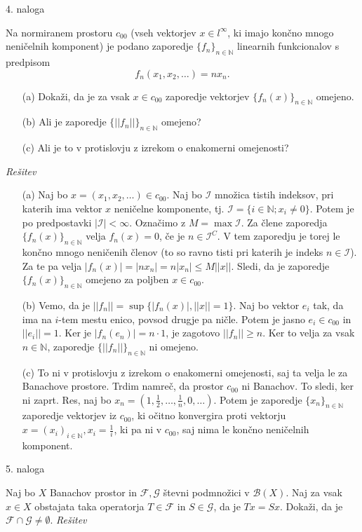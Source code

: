 \documentclass[a4paper, 12pt]{article}
\newcommand{\N}{\mathbb{N}}
\begin{document}
\begin{flushleft}
4. naloga
\end{flushleft}
Na normiranem prostoru $c_{00}$ (vseh vektorjev $x\in l^{\infty}$, ki imajo končno mnogo neničelnih komponent) je podano zaporedje $\{f_n\}_{n\in \N}$ linearnih funkcionalov s predpisom
$$
f_n(x_1,x_2,\dots) = n x_n.
$$
\begin{enumerate}
\item[(a)] Dokaži, da je za vsak $x\in c_{00}$ zaporedje vektorjev $\{ f_n(x) \}_{n\in \N}$ omejeno.
\item[(b)] Ali je zaporedje $\{ || f_n || \}_{n\in \N}$ omejeno?
\item[(c)] Ali je to v protislovju z izrekom o enakomerni omejenosti?
\end{enumerate}
\emph{Rešitev}
\begin{enumerate}
\item[(a)] Naj bo $x=(x_1,x_2,\dots) \in c_{00}$. Naj bo $\mathcal{I}$ množica tistih indeksov, pri katerih ima vektor $x$ neničelne komponente, tj. $\mathcal{I} = \{ i \in \N; x_i \neq 0\}$. Potem je po predpostavki $|\mathcal{I} | < \infty$. Označimo z $M = \max \mathcal{I}$. Za člene zaporedja $\{f_n(x)\}_{n\in \N}$ velja $f_n(x) = 0$, če je $n\in \mathcal{I}^C$. V tem zaporedju je torej le končno mnogo neničenih členov (to so ravno tisti pri katerih je indeks $n\in \mathcal{I}$). Za te pa velja $|f_n(x)| = |nx_n| =n |x_n| \le M ||x||$. Sledi, da je zaporedje $\{f_n(x)\}_{n\in \N}$ omejeno za poljben $x\in c_{00}$.

\item[(b)] Vemo, da je $||f_n|| = \sup\{|f_n(x)|, ||x||=1\}$. Naj bo vektor $e_i$ tak, da ima na $i$-tem mestu enico, povsod drugje pa ničle. Potem je jasno $e_i\in c_{00}$ in $||e_i||=1$. Ker je $|f_n(e_n)| = n\cdot 1$, je zagotovo $||f_n|| \ge n$. Ker to velja za vsak $n\in \N$, zaporedje $\{||f_n||\}_{n\in \N}$ ni omejeno.

\item[(c)] To ni v protislovju z izrekom o enakomerni omejenosti, saj ta velja le za Banachove prostore. Trdim namreč, da prostor $c_{00}$ ni Banachov. To sledi, ker ni zaprt. Res, naj bo $x_{n} = (1,\frac{1}{2},\dots,\frac{1}{n},0,\dots)$. Potem je zaporedje $\{x_n\}_{n\in\N}$ zaporedje vektorjev iz $c_{00}$, ki očitno konvergira proti vektorju $x=(x_i)_{i\in \N}, x_i = \frac{1}{i}$, ki pa ni v $c_{00}$, saj nima le končno neničelnih komponent. 
\end{enumerate}


\begin{flushleft}
5. naloga
\end{flushleft}
Naj bo $X$ Banachov prostor in $\mathcal{F}, \mathcal{G}$ števni podmnožici v $\mathcal{B}(X)$. Naj za vsak $x\in X$ obstajata taka operatorja $T\in \mathcal{F}$ in $S\in \mathcal{G}$, da je $Tx = Sx$. Dokaži, da je $\mathcal{F} \cap \mathcal{G} \neq \emptyset$.
\newline
\emph{Rešitev}
\end{document}
